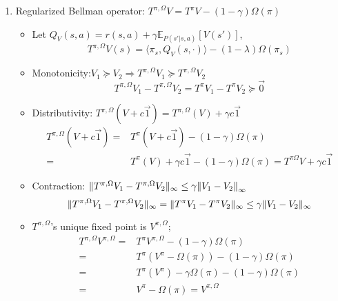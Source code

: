 \documentclass[a4paper]{article}
\begin{document}
\begin{enumerate}
    \item Regularized Bellman operator: $ T^{\pi,\Omega}V = T^{\pi} V - (1-\gamma)\Omega(\pi)$\\
        \begin{itemize}
            \item Let $ Q_V(s,a) = r(s,a) + \gamma \mathbb{E}_{P(s'|s,a)}\left[ V(s') \right] $,
                \[
                    T^{\pi,\Omega}V (s) = \langle \pi_s, Q_V(s, \cdot) \rangle - (1 - \lambda)\Omega(\pi_s)
                \]
            \item Monotonicity:$ V_1 \succeq V_2 \Rightarrow T^{\pi, \Omega}V_1 \succeq T^{\pi, \Omega}V_2 $
                \[
                    T^{\pi, \Omega}V_1 - T^{\pi, \Omega}V_2 = T^{\pi}V_1 - T^{\pi}V_2 \succeq \vec{0}
                \]
            \item Distributivity: $ T^{\pi, \Omega}(V + c \vec{1}) =  T^{\pi, \Omega}(V) + \gamma c \vec{1} $
                \begin{align*}
                    T^{\pi, \Omega}(V + c \vec{1}) =& T^{\pi}(V + c \vec{1}) - (1-\gamma)\Omega(\pi) \\
                    =& T^{\pi}(V) + \gamma c \vec{1} - (1-\gamma)\Omega(\pi) = T^{\pi \Omega}V + \gamma c \vec{1}
                \end{align*}
                \item Contraction: $ \Arrowvert T^{\pi, \Omega}V_1 - T^{\pi, \Omega}V_2 \Arrowvert_{\infty} \le \gamma {\Arrowvert V_1 - V_2 \Arrowvert}_\infty $
                    \[
                        \Arrowvert T^{\pi, \Omega}V_1 - T^{\pi, \Omega}V_2 \Arrowvert_{\infty}
                        = \Arrowvert T^{\pi}V_1 - T^{\pi}V_2 \Arrowvert_{\infty}
                        \le \gamma \Arrowvert V_1 - V_2 \Arrowvert_{\infty}
                    \]
            \item $ T^{\pi,\Omega} $'s unique fixed point is $ V^{\pi, \Omega} $;
                \begin{align*}
                    T^{\pi, \Omega}V^{\pi, \Omega} =& T^{\pi}V^{\pi, \Omega} - (1 - \gamma) \Omega(\pi)\\
                    =& T^{\pi}\left( V^{\pi} - \Omega(\pi) \right) - (1 - \gamma) \Omega(\pi)\\
                    =& T^{\pi}(V^{\pi}) - \gamma \Omega(\pi) - (1-\gamma) \Omega(\pi)\\
                    =& V^{\pi} - \Omega(\pi) = V^{\pi, \Omega}
                \end{align*}
        \end{itemize}

\end{enumerate}
\end{document}
